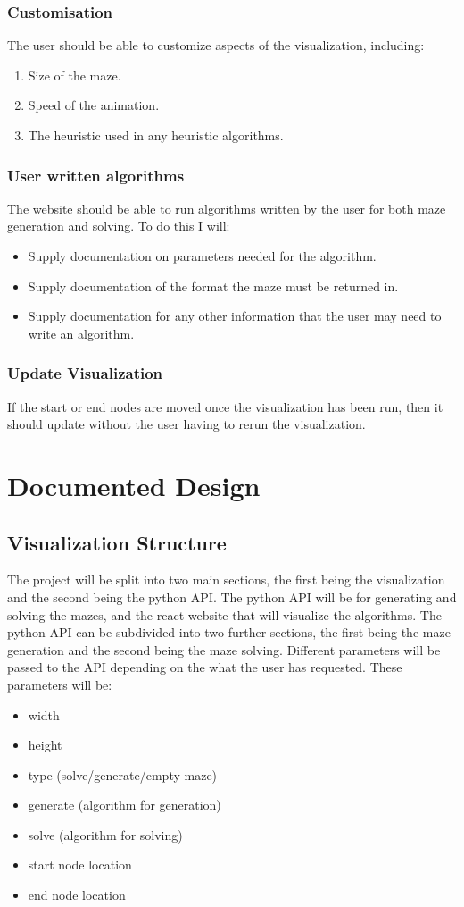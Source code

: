 \documentclass[titlepage]{article}
\begin{document}
\subsubsection{Customisation}
The user should be able to customize aspects of the visualization, including:
\begin{enumerate}
    \item Size of the maze.
    \item Speed of the animation.
    \item The heuristic used in any heuristic algorithms.
\end{enumerate}

\subsubsection{User written algorithms}
The website should be able to run algorithms written by the user for both maze generation and solving. To do this I will:
\begin{itemize}
    \item Supply documentation on parameters needed for the algorithm.
    \item Supply documentation of the format the maze must be returned in.
    \item Supply documentation for any other information that the user may need to write an algorithm.
\end{itemize}

\subsubsection{Update Visualization}
If the start or end nodes are moved once the visualization has been run, then it should update without the user having to rerun the visualization.
\newpage
\section{Documented Design}
\subsection{Visualization Structure}
The project will be split into two main sections, the first being the visualization and the second being the python API.
The python API will be for generating and solving the mazes, and the react website that will visualize the algorithms. The python API can be subdivided into two further sections, the first being the maze generation and the second being the maze solving. Different parameters will be passed to the API depending on the what the user has requested. These parameters will be:
\begin{itemize}
    \item width
    \item height
    \item type (solve/generate/empty maze)
    \item generate (algorithm for generation)
    \item solve (algorithm for solving)
    \item start node location
    \item end node location
\end{itemize} 
\end{document}
